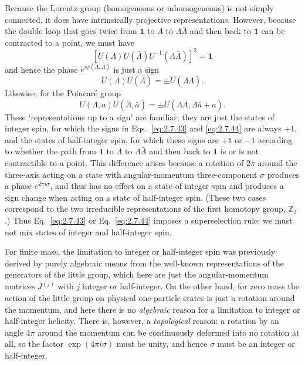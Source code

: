 Because the Lorentz group (homogeneous or inhomogeneous) is not simply
connected, it does have intrinsically projective representations. However,
because the double loop that goes twice from $\mathbf{1}$ to $\Lambda$ to
$\Lambda\bar\Lambda$ and then back to $\mathbf{1}$ can be contracted to a
point, we must have
\begin{equation*}
  \left[U(\Lambda)U(\bar\Lambda)
    U^{-1}(\Lambda\bar\Lambda)\right]^2=\mathbf{1}
\end{equation*}
and hence the phase $e^{i\phi(\Lambda,\bar\Lambda)}$ is just a sign
\begin{equation}
  U(\Lambda)U(\bar\Lambda)=\mathord{\pm}U(\Lambda\bar\Lambda).
  \tag{2.7.43}\label{eq:2.7.43}
\end{equation}
Likewise, for the Poincar\'e group
\begin{equation}
  U(\Lambda,a)U(\bar\Lambda,\bar a)
    =\mathord{\pm}U(\Lambda\bar\Lambda,\Lambda\bar a+a).
  \tag{2.7.44}\label{eq:2.7.44}
\end{equation}
These `representations up to a sign' are familiar; they are just the states of
integer spin, for which the signs in Eqs.~\eqref{eq:2.7.43} and \eqref{eq:2.7.44} are always $+1$,
and the states of half-integer spin, for which these signs are $+1$ or $-1$
according to whether the path from $\mathbf{1}$ to $\Lambda$ to
$\Lambda\bar\Lambda$ and then back to $\mathbf{1}$ is or is not contractible to
a point. This difference arises because a rotation of $2\pi$ around the
three-axis acting on a state with angular-momentum three-component $\sigma$
produces a phase $e^{2\pi i\sigma}$, and thus has no effect on a state of
integer spin and produces a sign change when acting on a state of half-integer
spin. (These two cases correspond to the two irreducible representations of the
first homotopy group, $\mathbb{Z}_2$.) Thus Eq.~\eqref{eq:2.7.43} or Eq.~\eqref{eq:2.7.44} imposes a
superselection rule: we must not mix states of integer and half-integer spin.

For finite mass, the limitation to integer or half-integer spin was previously
derived by purely algebraic means from the well-known representations of the
generators of the little group, which here are just the angular-momentum
matrices $J^{(j)}$ with $j$ integer or half-integer. On the other hand, for zero
mass the action of the little group on physical one-particle states is just a
rotation around the momentum, and here there is no \emph{algebraic} reason for
a limitation to integer or half-integer helicity. There is, however, a
\emph{topological} reason: a rotation by an angle $4\pi$ around the momentum can
be continuously deformed into no rotation at all, so the factor
$\exp(4\pi i\sigma)$ must be unity, and hence $\sigma$ must be an integer or
half-integer.

